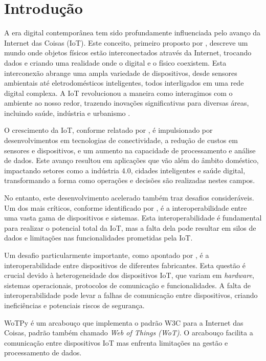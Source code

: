 \chapter{Introdução}

A era digital contemporânea tem sido profundamente influenciada pelo avanço da Internet das Coisas (IoT). Este conceito, primeiro proposto por \cite{Ashton2009}, descreve um mundo onde objetos físicos estão interconectados através da Internet, trocando dados e criando uma realidade onde o digital e o físico coexistem. Esta interconexão abrange uma ampla variedade de dispositivos, desde sensores ambientais até eletrodomésticos inteligentes, todos interligados em uma rede digital complexa. A IoT revolucionou a maneira como interagimos com o ambiente ao nosso redor, trazendo inovações significativas para diversas áreas, incluindo saúde, indústria e urbanismo \cite{Atzori2010}.

O crescimento da IoT, conforme relatado por \cite{Gubbi2013}, é impulsionado por desenvolvimentos em tecnologias de conectividade, a redução de custos em sensores e dispositivos, e um aumento na capacidade de processamento e análise de dados. Este avanço resultou em aplicações que vão além do âmbito doméstico, impactando setores como a indústria 4.0, cidades inteligentes e saúde digital, transformando a forma como operações e decisões são realizadas nestes campos.

No entanto, este desenvolvimento acelerado também traz desafios consideráveis. Um dos mais críticos, conforme identificado por \cite{Vermesan2013}, é a interoperabilidade entre uma vasta gama de dispositivos e sistemas. Esta interoperabilidade é fundamental para realizar o potencial total da IoT, mas a falta dela pode resultar em silos de dados e limitações nas funcionalidades prometidas pela IoT.

Um desafio particularmente importante, como apontado por \cite{AlFuqaha2015}, é a interoperabilidade entre dispositivos de diferentes fabricantes. Esta questão é crucial devido à heterogeneidade dos dispositivos IoT, que variam em \textit{hardware}, sistemas operacionais, protocolos de comunicação e funcionalidades. A falta de interoperabilidade pode levar a falhas de comunicação entre dispositivos, criando ineficiências e potenciais riscos de segurança.

WoTPy é um arcabouço que implementa o padrão W3C para a Internet das Coisas, padrão também chamado \textit{Web of Things (WoT)}. O arcabouço facilita a comunicação entre dispositivos IoT mas enfrenta limitações na gestão e processamento de dados.

